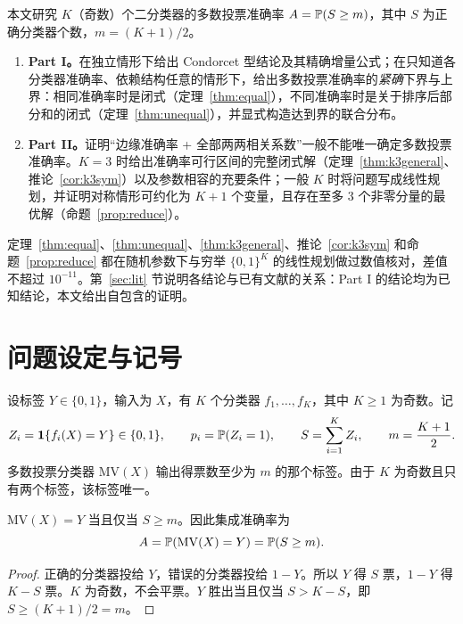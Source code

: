 \documentclass[11pt]{article}
\begin{document}

\begin{keybox}[title=摘要]
本文研究 $K$（奇数）个二分类器的多数投票准确率 $A=\mathbb{P}(S\ge m)$，其中 $S$ 为正确分类器个数，$m=(K+1)/2$。
\begin{enumerate}[leftmargin=1.6em]
\item \textbf{Part I。}在独立情形下给出 Condorcet 型结论及其精确增量公式；在只知道各分类器准确率、依赖结构任意的情形下，给出多数投票准确率的\emph{紧确}下界与上界：相同准确率时是闭式（定理~\ref{thm:equal}），不同准确率时是关于排序后部分和的闭式（定理~\ref{thm:unequal}），并显式构造达到界的联合分布。
\item \textbf{Part II。}证明“边缘准确率 + 全部两两相关系数”一般不能唯一确定多数投票准确率。$K=3$ 时给出准确率可行区间的完整闭式解（定理~\ref{thm:k3general}、推论~\ref{cor:k3sym}）以及参数相容的充要条件；一般 $K$ 时将问题写成线性规划，并证明对称情形可约化为 $K+1$ 个变量，且存在至多 3 个非零分量的最优解（命题~\ref{prop:reduce}）。
\end{enumerate}
定理~\ref{thm:equal}、\ref{thm:unequal}、\ref{thm:k3general}、推论~\ref{cor:k3sym} 和命题~\ref{prop:reduce} 都在随机参数下与穷举 $\{0,1\}^K$ 的线性规划做过数值核对，差值不超过 $10^{-11}$。第~\ref{sec:lit} 节说明各结论与已有文献的关系：Part I 的结论均为已知结论，本文给出自包含的证明。
\end{keybox}

\tableofcontents

\section{问题设定与记号}

\begin{definition}[基本设定]\label{def:setup}
设标签 $Y\in\{0,1\}$，输入为 $X$，有 $K$ 个分类器 $f_1,\dots,f_K$，其中 $K\ge1$ 为奇数。记
\[
Z_i=\mathbf{1}\{f_i(X)=Y\}\in\{0,1\},\qquad p_i=\mathbb{P}(Z_i=1),\qquad S=\sum_{i=1}^K Z_i,\qquad m=\frac{K+1}{2}.
\]
多数投票分类器 $\mathrm{MV}(X)$ 输出得票数至少为 $m$ 的那个标签。由于 $K$ 为奇数且只有两个标签，该标签唯一。
\end{definition}

\begin{lemma}\label{lem:mv}
$\mathrm{MV}(X)=Y$ 当且仅当 $S\ge m$。因此集成准确率为
\[
A=\mathbb{P}(\mathrm{MV}(X)=Y)=\mathbb{P}(S\ge m).
\]
\end{lemma}
\begin{proof}
正确的分类器投给 $Y$，错误的分类器投给 $1-Y$。所以 $Y$ 得 $S$ 票，$1-Y$ 得 $K-S$ 票。$K$ 为奇数，不会平票。$Y$ 胜出当且仅当 $S>K-S$，即 $S\ge (K+1)/2=m$。
\end{proof}
\end{document}
